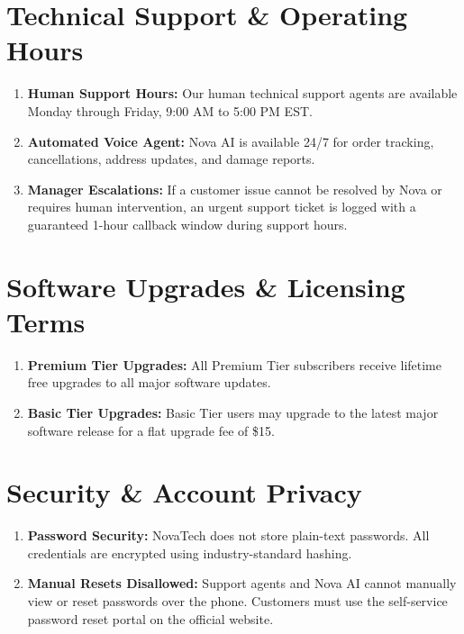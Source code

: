 \documentclass[11pt,a4paper]{article}
\begin{document}
\section{Technical Support \& Operating Hours}
\begin{enumerate}[label=\arabic*.]
    \item \textbf{Human Support Hours:} Our human technical support agents are available Monday through Friday, 9:00 AM to 5:00 PM EST.
    \item \textbf{Automated Voice Agent:} Nova AI is available 24/7 for order tracking, cancellations, address updates, and damage reports.
    \item \textbf{Manager Escalations:} If a customer issue cannot be resolved by Nova or requires human intervention, an urgent support ticket is logged with a guaranteed 1-hour callback window during support hours.
\end{enumerate}

\section{Software Upgrades \& Licensing Terms}
\begin{enumerate}[label=\arabic*.]
    \item \textbf{Premium Tier Upgrades:} All Premium Tier subscribers receive lifetime free upgrades to all major software updates.
    \item \textbf{Basic Tier Upgrades:} Basic Tier users may upgrade to the latest major software release for a flat upgrade fee of \$15.
\end{enumerate}

\section{Security \& Account Privacy}
\begin{enumerate}[label=\arabic*.]
    \item \textbf{Password Security:} NovaTech does not store plain-text passwords. All credentials are encrypted using industry-standard hashing.
    \item \textbf{Manual Resets Disallowed:} Support agents and Nova AI cannot manually view or reset passwords over the phone. Customers must use the self-service password reset portal on the official website.
\end{enumerate}
\end{document}
